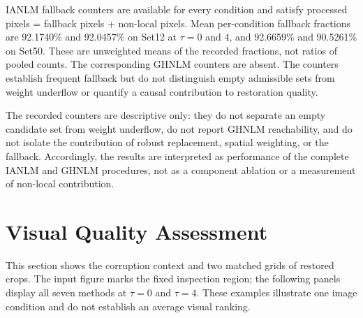 \documentclass[pdflatex,iicol,sn-mathphys-num]{sn-jnl}
\newif\ifshowportuguese
\newcommand{\pt}[1]{\ifshowportuguese\par\begingroup\small\color{blue!55!black}\noindent\textbf{PT: }#1\par\endgroup\fi}
\begin{document}
IANLM fallback counters are available for every condition and satisfy processed pixels = fallback pixels + non-local pixels. Mean per-condition fallback fractions are 92.1740\% and 92.0457\% on Set12 at $\tau=0$ and 4, and 92.6659\% and 90.5261\% on Set50. These are unweighted means of the recorded fractions, not ratios of pooled counts. The corresponding GHNLM counters are absent. The counters establish frequent fallback but do not distinguish empty admissible sets from weight underflow or quantify a causal contribution to restoration quality.
\pt{As contagens de fallback do IANLM estão disponíveis para todas as condições e satisfazem pixels processados = pixels de fallback + pixels não locais. As frações médias de fallback por condição são 92,1740\% e 92,0457\% no Set12 em $\tau=0$ e 4 e 92,6659\% e 90,5261\% no Set50. Essas são médias não ponderadas das frações registradas, não razões entre contagens agrupadas. As contagens correspondentes do GHNLM estão ausentes. As contagens estabelecem fallback frequente, mas não distinguem conjuntos admissíveis vazios de underflow dos pesos nem quantificam uma contribuição causal à qualidade da restauração.}

The recorded counters are descriptive only: they do not separate an empty candidate set from weight underflow, do not report GHNLM reachability, and do not isolate the contribution of robust replacement, spatial weighting, or the fallback. Accordingly, the results are interpreted as performance of the complete IANLM and GHNLM procedures, not as a component ablation or a measurement of non-local contribution.
\pt{Os contadores registrados são apenas descritivos: eles não separam conjunto candidato vazio de underflow dos pesos, não relatam alcançabilidade do GHNLM e não isolam a contribuição da substituição robusta, da ponderação espacial ou do fallback. Consequentemente, os resultados são interpretados como desempenho dos procedimentos completos IANLM e GHNLM, e não como ablação de componentes nem medida da contribuição não local.}

\section{Visual Quality Assessment}
\label{subsec:visual_quality}

This section shows the corruption context and two matched grids of restored crops. The input figure marks the fixed inspection region; the following panels display all seven methods at $\tau=0$ and $\tau=4$. These examples illustrate one image condition and do not establish an average visual ranking.
\pt{Esta seção apresenta o contexto da corrupção e duas grades correspondentes de recortes restaurados. A figura das entradas marca a região fixa de inspeção; os painéis seguintes mostram os sete métodos em $\tau=0$ e $\tau=4$. Esses exemplos ilustram uma condição de imagem e não estabelecem um ranking visual médio.}
\end{document}
